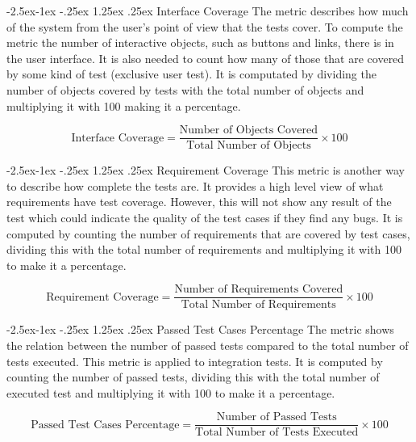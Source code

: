\documentclass{article}
\makeatletter
\renewcommand\paragraph{\@startsection{paragraph}{4}{\z@}%
	{-2.5ex\@plus -1ex \@minus -.25ex}%
	{1.25ex \@plus .25ex}%
	{\normalfont\normalsize\bfseries}}
\makeatother
\begin{document}
	\paragraph{Interface Coverage} 
	The metric describes how much of the system from the user's point of view that the tests cover. To compute the metric the number of interactive objects, such as buttons and links, there is in the user interface. It is also needed to count how many of those that are covered by some kind of test (exclusive user test). It is computated by dividing the number of objects covered by tests with the total number of objects and multiplying it with 100 making it a percentage.
	
	\begin{equation}
		\text{Interface Coverage} = \frac{\text{Number of Objects Covered}}{\text{Total Number of Objects}} \times 100
	\end{equation}
		
	\paragraph{Requirement Coverage}
	This metric is another way to describe how complete the tests are. It provides a high level view of what requirements have test coverage. However, this will not show any result of the test which could indicate the quality of the test cases if they find any bugs. It is computed by counting the number of requirements that are covered by test cases, dividing this with the total number of requirements and multiplying it with 100 to make it a percentage.
	
	\begin{equation}
		\text{Requirement Coverage} = \frac{\text{Number of Requirements Covered}}{\text{Total Number of Requirements}} \times 100
	\end{equation}
	
	\paragraph{Passed Test Cases Percentage}
	The metric shows the relation between the number of passed tests compared to the total number of tests executed. This metric is applied to integration tests. It is computed by counting the number of passed tests, dividing this with the total number of executed test and multiplying it with 100 to make it a percentage.
	
	\begin{equation}
		\text{Passed Test Cases Percentage} = \frac{\text{Number of Passed Tests}}{\text{Total Number of Tests Executed}} \times 100
	\end{equation}
	
\end{document}
